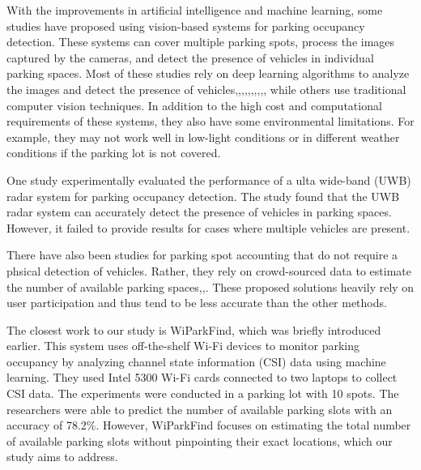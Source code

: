 With the improvements in artificial intelligence and machine learning, some studies have proposed using vision-based systems for parking occupancy detection. These systems can cover multiple parking spots\cite{7895130}, process the images captured by the cameras, and detect the presence of vehicles in individual parking spaces. Most of these studies rely on deep learning algorithms to analyze the images and detect the presence of vehicles\cite{Agrawal2020MultiAnglePD},\cite{Bohush2019ExtractionOI},\cite{Coleiro2020CarPD},\cite{HurstTarrab2020RobustPB},\cite{Patel2020FasterRB},\cite{MartnNieto2019AutomaticVP},\cite{Pannerselvam2021AdaptivePS},\cite{Patel2020CarDB},\cite{Vtek2017ADW},\cite{Wang2023GlobalPR}, while others use traditional computer vision techniques\cite{Zhang2020ImageBasedAF}. In addition to the high cost and computational requirements of these systems, they also have some environmental limitations. For example, they may not work well in low-light conditions or in different weather conditions if the parking lot is not covered.

One study experimentally evaluated the performance of a ulta wide-band (UWB) radar system for parking occupancy detection\cite{Ninnemann2022MultipathAssistedRS}. The study found that the UWB radar system can accurately detect the presence of vehicles in parking spaces. However, it failed to provide results for cases where multiple vehicles are present.

There have also been studies for parking spot accounting that do not require a phsical detection of vehicles. Rather, they rely on crowd-sourced data to estimate the number of available parking spaces\cite{Bock2020SmartPU},\cite{7517783},\cite{10.1145/2632048.2632098}. These proposed solutions heavily rely on user participation and thus tend to be less accurate than the other methods. 


The closest work to our study is WiParkFind, which was briefly introduced earlier. This system uses off-the-shelf Wi-Fi devices to monitor parking occupancy by analyzing channel state information (CSI) data using machine learning\cite{8422973}. They used Intel 5300 Wi-Fi cards connected to two laptops to collect CSI data. The experiments were conducted in a parking lot with 10 spots. The researchers were able to predict the number of available parking slots with an accuracy of 78.2\%. However, WiParkFind focuses on estimating the total number of available parking slots without pinpointing their exact locations, which our study aims to address.

